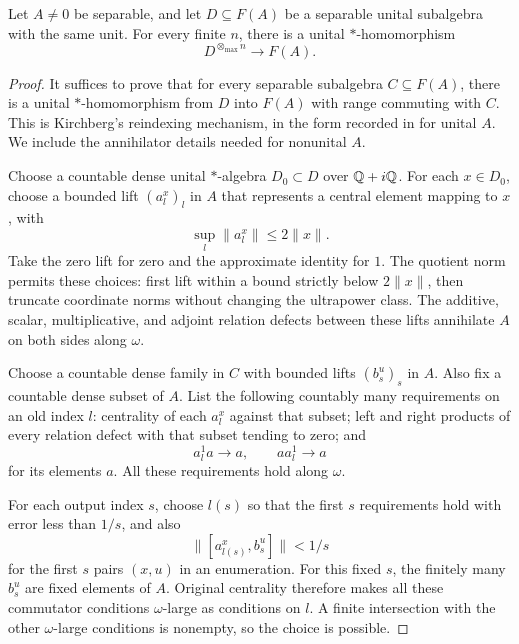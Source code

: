 \begin{lemma}\label{lem:reindex}
Let \(A\ne0\) be separable, and let \(D\subseteq F(A)\) be a separable unital subalgebra with the same unit. For every finite \(n\), there is a unital \(*\)-homomorphism
\[
 D^{\otimes_{\max}n}\longrightarrow F(A).
\]
\end{lemma}
\begin{proof}
It suffices to prove that for every separable subalgebra \(C\subseteq F(A)\), there is a unital \(*\)-homomorphism from \(D\) into \(F(A)\) with range commuting with \(C\). This is Kirchberg's reindexing mechanism, in the form recorded in
\cite[Proposition~2.2 and Corollary~2.3]{KR} for unital $A$. We include
the annihilator details needed for nonunital $A$.

Choose a countable dense unital \(*\)-algebra \(D_0\subset D\) over \(\mathbb Q+i\mathbb Q\). For each \(x\in D_0\), choose a bounded lift \((a_l^x)_l\) in \(A\) that represents a central element mapping to \(x\), with
\begin{equation}\label{eq:liftbound}
 \sup_l\|a_l^x\|\leq2\|x\|.
\end{equation}
Take the zero lift for zero and the approximate identity for \(1\). The quotient norm permits these choices: first lift within a bound strictly below \(2\|x\|\), then truncate coordinate norms without changing the ultrapower class. The additive, scalar, multiplicative, and adjoint relation defects between these lifts annihilate \(A\) on both sides along \(\omega\).

Choose a countable dense family in \(C\) with bounded lifts \((b_s^u)_s\) in \(A\). Also fix a countable dense subset of \(A\). List the following countably many requirements on an old index \(l\): centrality of each \(a_l^x\) against that subset; left and right products of every relation defect with that subset tending to zero; and
\[
 a_l^1a\longrightarrow a,\qquad aa_l^1\longrightarrow a
\]
for its elements \(a\). All these requirements hold along \(\omega\).

For each output index \(s\), choose \(l(s)\) so that the first \(s\) requirements hold with error less than \(1/s\), and also
\[
 \|[a_{l(s)}^x,b_s^u]\|<1/s
\]
for the first \(s\) pairs \((x,u)\) in an enumeration. For this fixed \(s\), the finitely many \(b_s^u\) are fixed elements of \(A\). Original centrality therefore makes all these commutator conditions \(\omega\)-large as conditions on \(l\). A finite intersection with the other \(\omega\)-large conditions is nonempty, so the choice is possible.


\end{proof}
